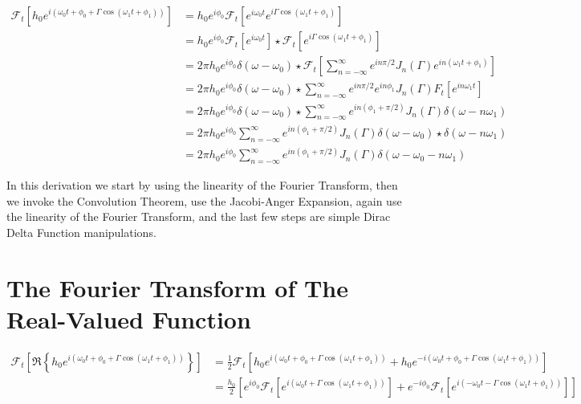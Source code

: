 \documentclass[onecolumn, groupedaddress, 10pt]{revtex4-1}
\begin{document}
\begin{align}
\mathcal{F}_t \left[ h_0 e^{i\left( \omega_0 t + \phi_0 + \Gamma \cos( \omega_1 t + \phi_1 ) \right)} \right]
&= h_0 e^{i\phi_0} \mathcal{F}_t \left[ e^{i\omega_0 t} e^{i\Gamma \cos(\omega_1 t + \phi_1)} \right]											\\
&= h_0 e^{i\phi_0} \mathcal{F}_t \left[ e^{i\omega_0 t} \right] \star \mathcal{F}_t \left[ e^{i\Gamma \cos(\omega_1 t + \phi_1)} \right]		\\
&= 2 \pi h_0 e^{i\phi_0} \delta(\omega - \omega_0) 
			\star \mathcal{F}_t \left[ \sum_{n=-\infty}^{\infty} e^{in\pi/2} J_n(\Gamma) e^{in(\omega_1 t + \phi_1)} \right]							\\
&= 2 \pi h_0 e^{i\phi_0} \delta(\omega - \omega_0) \star \sum_{n=-\infty}^{\infty} e^{in\pi/2} e^{in\phi_1} J_n(\Gamma) F_t \left[ e^{in\omega_1 t} \right]	\\
&= 2 \pi h_0 e^{i\phi_0} \delta(\omega - \omega_0) \star \sum_{n=-\infty}^{\infty} e^{in(\phi_1 + \pi/2)} J_n(\Gamma) \delta(\omega - n\omega_1)			\\
&= 2 \pi h_0 e^{i\phi_0} \sum_{n=-\infty}^{\infty} e^{in(\phi_1 + \pi/2)} J_n(\Gamma)  \delta(\omega - \omega_0) \star \delta(\omega - n\omega_1)			\\
&= 2 \pi h_0 e^{i\phi_0} \sum_{n=-\infty}^{\infty} e^{in(\phi_1 + \pi/2)} J_n(\Gamma)  \delta(\omega - \omega_0 - n\omega_1)
\end{align}

In this derivation we start by using the linearity of the Fourier Transform, then we invoke the Convolution Theorem, use the Jacobi-Anger Expansion, again use the linearity of the Fourier Transform, and the last few steps are simple Dirac Delta Function manipulations.

\section{The Fourier Transform of The Real-Valued Function}

\begin{align}
\mathcal{F}_t \left[ \Re \left\{ h_0 e^{i\left( \omega_0 t + \phi_0 + \Gamma \cos( \omega_1 t + \phi_1 ) \right)} \right\} \right]
&= \frac{1}{2} \mathcal{F}_t \left[ h_0 e^{i\left( \omega_0 t + \phi_0 + \Gamma \cos( \omega_1 t + \phi_1 ) \right)} 
                        + h_0 e^{-i\left( \omega_0 t + \phi_0 + \Gamma \cos( \omega_1 t + \phi_1 ) \right)} \right]			\\
&= \frac{h_0}{2} \left[ 
  e^{ i\phi_0} \mathcal{F}_t \left[ e^{i\left(  \omega_0 t + \Gamma \cos( \omega_1 t + \phi_1 ) \right)} \right] 
+ e^{-i\phi_0} \mathcal{F}_t \left[ e^{i\left( -\omega_0 t - \Gamma \cos( \omega_1 t + \phi_1 ) \right)} \right] 
\right]
\end{align}
\end{document}
